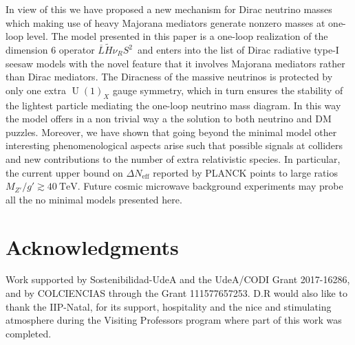 \documentclass[12pt]{article}
\begin{document}
In view of this we have proposed a new mechanism for Dirac neutrino masses which making use of heavy Majorana mediators generate nonzero masses at one-loop level. 
The model presented in this paper is a one-loop realization of the dimension 6 operator $\overline{L} \tilde{H} \nu_R S^2\,$ and enters into the list of Dirac radiative type-I seesaw models with the novel feature that it involves Majorana mediators rather than Dirac mediators. 
The Diracness of the massive neutrinos is protected by only one extra $\operatorname{U}(1)_X$ gauge symmetry, which in turn ensures the stability of the lightest particle mediating the one-loop neutrino mass diagram. 
In this way the model offers in a non trivial way a the solution to both neutrino and DM puzzles.
Moreover, we have shown that going beyond the minimal model other interesting phenomenological aspects arise such that possible signals at colliders and new contributions to the number of extra relativistic species. In particular, the  current upper bound on $\Delta N_{\text{eff}}$ reported by PLANCK points to large ratios $M_{Z'}/g'\gtrsim 40\ \text{TeV}$. Future cosmic microwave background experiments may probe all the no minimal models presented here. 

  
\section*{Acknowledgments}
Work supported by Sostenibilidad-UdeA and the UdeA/CODI Grant
2017-16286, and by COLCIENCIAS through the Grant 111577657253. D.R
would also like to thank the IIP-Natal, for its support,
hospitality and the nice and stimulating atmosphere during the
Visiting Professors program where part of this work was completed.
\appendix
\end{document}
